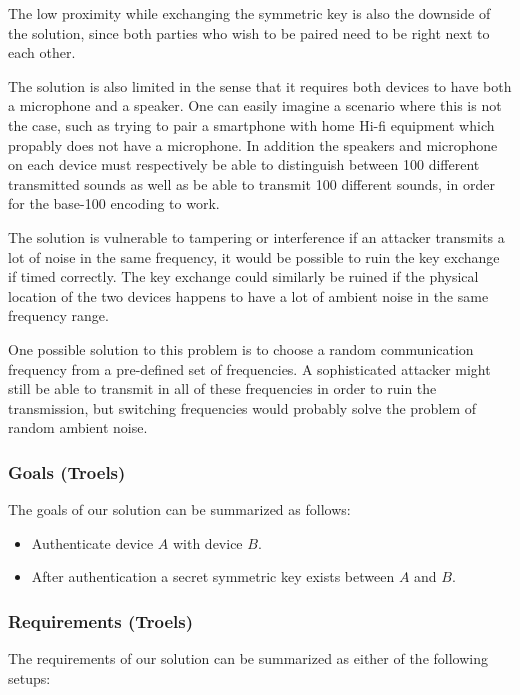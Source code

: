 \documentclass[12pt]{article}
\begin{document}
The low proximity while exchanging the symmetric key is also the downside of the solution, since both parties who wish to be paired need to be right next to each other.

The solution is also limited in the sense that it requires both devices to have both a microphone and a speaker. One can easily imagine a scenario where this is not the case, such as trying to pair a smartphone with home Hi-fi equipment which propably does not have a microphone. In addition the speakers and microphone on each device must respectively be able to distinguish between 100 different transmitted sounds as well as be able to transmit 100 different sounds, in order for the base-100 encoding to work.

The solution is vulnerable to tampering or interference if an attacker transmits a lot of noise in the same frequency, it would be possible to ruin the key exchange if timed correctly. The key exchange could similarly be ruined if the physical location of the two devices happens to have a lot of ambient noise in the same frequency range.

One possible solution to this problem is to choose a random communication frequency from a pre-defined set of frequencies. A sophisticated attacker might still be able to transmit in all of these frequencies in order to ruin the transmission, but switching frequencies would probably solve the problem of random ambient noise.

\subsubsection{Goals (Troels)}
\label{subs:Goals}

The goals of our solution can be summarized as follows:

\begin{itemize}
    \item Authenticate device $A$ with device $B$.
    \item After authentication a secret symmetric key exists between $A$ and $B$.
\end{itemize}

\subsubsection{Requirements (Troels)}
\label{subs:Requirements}

The requirements of our solution can be summarized as either of the following setups:
\end{document}
